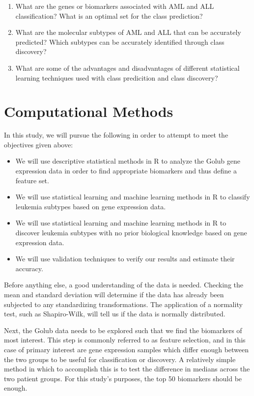 \documentclass[]{article}
\begin{document}
\begin{enumerate}
\def\labelenumi{\arabic{enumi}.}
\item
  What are the genes or biomarkers associated with AML and ALL
  classification? What is an optimal set for the class prediction?
\item
  What are the molecular subtypes of AML and ALL that can be accurately
  predicted? Which subtypes can be accurately identified through class
  discovery?
\item
  What are some of the advantages and disadvantages of different
  statistical learning techniques used with class predicition and class
  discovery?
\end{enumerate}

\section{Computational Methods}\label{computational-methods}

In this study, we will pursue the following in order to attempt to meet
the objectives given above:

\begin{itemize}
\item
  We will use descriptive statistical methods in R to analyze the Golub
  gene expression data in order to find appropriate biomarkers and thus
  define a feature set.
\item
  We will use statistical learning and machine learning methods in R to
  classify leukemia subtypes based on gene expression data.
\item
  We will use statistical learning and machine learning methods in R to
  discover leukemia subtypes with no prior biological knowledge based on
  gene expression data.
\item
  We will use validation techniques to verify our results and estimate
  their accuracy.
\end{itemize}

Before anything else, a good understanding of the data is needed.
Checking the mean and standard deviation will determine if the data has
already been subjected to any standardizing transformations. The
application of a normality test, such as Shapiro-Wilk, will tell us if
the data is normally distributed.

Next, the Golub data needs to be explored such that we find the
biomarkers of most interest. This step is commonly referred to as
feature selection, and in this case of primary interest are gene
expression samples which differ enough between the two groups to be
useful for classification or discovery. A relatively simple method in
which to accomplish this is to test the difference in medians across the
two patient groups. For this study's purposes, the top 50 biomarkers
should be enough.
\end{document}
